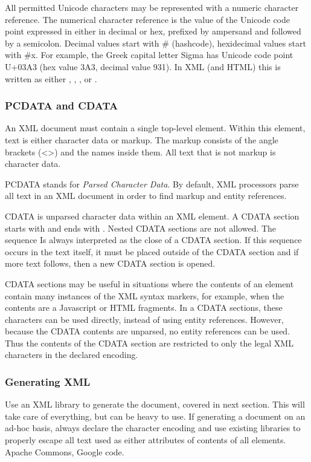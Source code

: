 All permitted Unicode characters may be represented with a numeric character reference.
The numerical character reference is the value of the Unicode code point
expressed in either in decimal or hex, 
prefixed by ampersand and followed by a semicolon.
Decimal values start with \# (hashcode), hexidecimal values start with \#x.
For example, the Greek capital letter Sigma has Unicode code point U+03A3
(hex value 3A3, decimal value 931).  In XML (and HTML) this is written as either
, , ,  or .

\subsubsection{PCDATA and CDATA}

An XML document must contain a single top-level element.
Within this element, text is either character data or markup.
The markup consists of the angle brackets (<>) and the names inside them.
All text that is not markup is character data.

PCDATA stands for \emph{Parsed Character Data}.
By default, XML processors parse all text in an XML document
in order to find markup and entity references.

CDATA is unparsed character data within an XML element.
A CDATA section starts with \code{<!CDATA[} and ends with \code{]]>}.
Nested CDATA sections are not allowed.  The sequence \code{]]>}
Is always interpreted as the close of a CDATA section.
If this sequence occurs in the text itself, it must be placed outside
of the CDATA section and if more text follows, then a new CDATA section is opened.

CDATA sections may be useful in situations where the contents of
an element contain many instances of the XML syntax markers, for example, when the
contents are a Javascript or HTML fragments.  In a CDATA sections, these characters can
be used directly, instead of using entity references.  However, because the CDATA
contents are unparsed, no entity references can be used.  Thus the contents of the
CDATA section are restricted to only the legal XML characters in the declared encoding.

\subsubsection{Generating XML}

Use an XML library to generate the document, covered in next section.
This will take care of everything, but can be heavy to use.
If generating a document on an ad-hoc basis, always declare
the character encoding and use existing libraries to properly
escape all text used as either attributes of contents of all elements.
Apache Commons, Google code.


